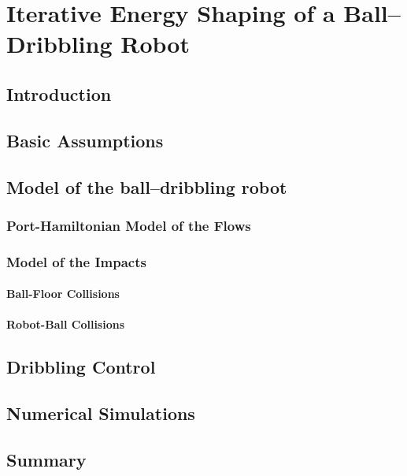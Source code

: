 
\chapter{Iterative Energy Shaping of a Ball--Dribbling Robot}

\label{chap:multistable}
\minitoc

\thispagestyle{empty}

\newpage
\section{Introduction}
%

\clearpage
\section{Basic Assumptions}
%
\clearpage
\section{Model of the ball--dribbling robot}\label{sec:DBR}
\subsection{Port-Hamiltonian Model of the Flows}
\subsection{Model of the Impacts}
\subsubsection{Ball-Floor Collisions}
\subsubsection{Robot-Ball Collisions}

\clearpage
\section{Dribbling Control}\label{sec:control}

\clearpage
\section{Numerical Simulations}

\clearpage
\section{Summary}
